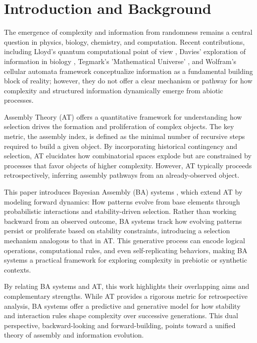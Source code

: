 \documentclass[entropy,article,submit,pdftex,oneauthor]{Definitions/mdpi}
\begin{document}
\section{Introduction and Background}

The emergence of complexity and information from randomness remains a central question in physics, biology, chemistry, and computation. Recent contributions, including Lloyd's quantum computational point of view \cite{lloyd2006programming}, Davies' exploration of information in biology \cite{davies2019demon}, Tegmark's 'Mathematical Universe' \cite{tegmark2008mathematical}, and Wolfram's cellular automata framework \cite{wolfram2020fundamental} conceptualize information as a fundamental building block of reality; however, they do not offer a clear mechanism or pathway for how complexity and structured information dynamically emerge from abiotic processes.

Assembly Theory (AT) \cite{walker2023nature} offers a quantitative framework for understanding how selection drives the formation and proliferation of complex objects. The key metric, the assembly index, is defined as the minimal number of recursive steps required to build a given object. By incorporating historical contingency and selection, AT elucidates how combinatorial spaces explode but are constrained by processes that favor objects of higher complexity. However, AT typically proceeds retrospectively, inferring assembly pathways from an already-observed object.

This paper introduces Bayesian Assembly (BA) systems \cite{adler2024howinfoevolves}, which extend AT by modeling forward dynamics: How patterns evolve from base elements through probabilistic interactions and stability-driven selection. Rather than working backward from an observed outcome, BA systems track how evolving patterns persist or proliferate based on stability constraints, introducing a selection mechanism analogous to that in AT. This generative process can encode logical operations, computational rules, and even self-replicating behaviors, making BA systems a practical framework for exploring complexity in prebiotic or synthetic contexts.

By relating BA systems and AT, this work highlights their overlapping aims and complementary strengths. While AT provides a rigorous metric for retrospective analysis, BA systems offer a predictive and generative model for how stability and interaction rules shape complexity over successive generations. This dual perspective, backward-looking and forward-building, points toward a unified theory of assembly and information evolution.
\end{document}
